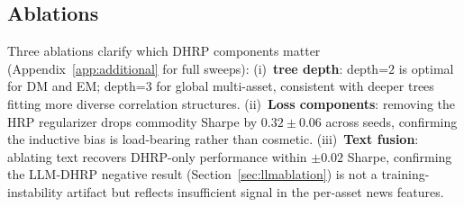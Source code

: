 \subsection{Ablations}
\label{sec:results_ablations}

Three ablations clarify which DHRP components matter
(Appendix~\ref{app:additional} for full sweeps): (i)~\textbf{tree
depth}: depth=$2$ is optimal for DM and EM; depth=$3$ for global
multi-asset, consistent with deeper trees fitting more diverse
correlation structures. (ii)~\textbf{Loss components}: removing the
HRP regularizer drops commodity Sharpe by $0.32 \pm 0.06$ across seeds,
confirming the inductive bias is load-bearing rather than cosmetic.
(iii)~\textbf{Text fusion}: ablating text recovers DHRP-only
performance within $\pm 0.02$ Sharpe, confirming the LLM-DHRP negative
result (Section~\ref{sec:llmablation}) is not a training-instability
artifact but reflects insufficient signal in the per-asset news
features.
